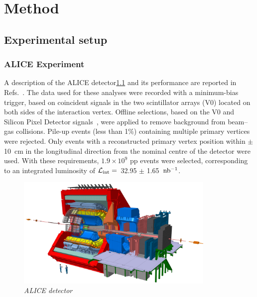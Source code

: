 \chapter{Method}
\section{Experimental setup}
\subsection{ALICE Experiment}
A description of the ALICE detector\ref{fig:alice_detector} and its performance are reported in Refs.~\cite{Alice_performance,Aamodt:2008zz}. 
The data used for these analyses were recorded with a minimum-bias trigger, based on coincident signals in the two scintillator arrays (V0) located on both sides of the interaction vertex.
Offline selections, based on the V0 and Silicon Pixel Detector signals~\cite{Reidt:2151986}, were applied to remove background from beam--gas collisions.
Pile-up events (less than 1\%) containing multiple primary vertices were rejected.
Only events with a reconstructed primary vertex position within $\pm$10~cm in the longitudinal direction from the nominal centre of the detector were used.
With these requirements, $1.9 \times 10^9$ pp events were selected, corresponding to an integrated luminosity of $\mathcal{L}_{\rm int}=$~32.95 $\pm$ 1.65~${\rm nb^{-1}}$.

\begin{figure}[!htb]
    \includegraphics[width=0.85\textwidth]{fig/alice_detector_no_ITS.jpg}
    \caption{\it ALICE detector}
    \label{fig:alice_detector}
\end{figure}
    